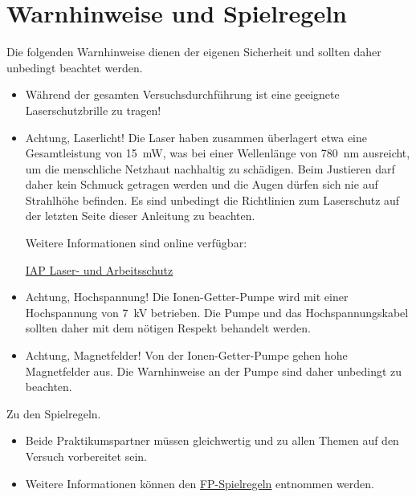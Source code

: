 \documentclass[
class=book,
accentcolor=1b,
custommargins=geometry,
fontsize=11pt,
thesis={type=Versuchsanleitung},
ruledheaders=all,
headline=false,
instbox=false,
marginpar=false,
title=small,
ignore-missing-data=true,
twoside=false,
logofile=apqdesign/tuda_logo.pdf,
pdfa=false %
]{apqpub}
\begin{document}
	\tableofcontents
	
	\mainmatter
	\setcounter{page}{1}
	
	
	
	
\chapter{Warnhinweise und Spielregeln}
Die folgenden Warnhinweise dienen der eigenen Sicherheit und sollten daher unbedingt beachtet werden.
\begin{itemize}
	\item Während der gesamten Versuchsdurchführung ist eine geeignete Laserschutzbrille zu tragen!
	
	\item Achtung, Laserlicht! Die Laser haben zusammen überlagert etwa eine Gesamtleistung von \qty{15}{\milli\watt}, was bei
	einer Wellenlänge von \qty{780}{\nano\metre} ausreicht, um die menschliche Netzhaut nachhaltig zu schädigen. Beim Justieren
	darf daher kein Schmuck getragen werden und die Augen dürfen sich nie auf Strahlhöhe befinden.
	Es sind unbedingt die Richtlinien zum Laserschutz auf der letzten Seite dieser Anleitung zu beachten.
	
	Weitere Informationen sind online verfügbar:
	
	\href{https://www.iap.tu-darmstadt.de/infrastruktur_iap/laser_und_arbeitsschutz_iap/index.de.jsp}{IAP Laser- und Arbeitsschutz}
	
	\item Achtung, Hochspannung! Die Ionen-Getter-Pumpe wird mit einer Hochspannung von \qty{7}{\kilo\volt} betrieben. Die
	Pumpe und das Hochspannungskabel sollten daher mit dem nötigen Respekt behandelt werden.
	
	\item Achtung, Magnetfelder! Von der Ionen-Getter-Pumpe gehen hohe Magnetfelder aus. Die Warnhinweise an
	der Pumpe sind daher unbedingt zu beachten.
\end{itemize}

Zu den Spielregeln.
\begin{itemize}
	\item Beide Praktikumspartner müssen gleichwertig und zu allen Themen auf den Versuch vorbereitet sein.
	
	\item Weitere Informationen können den \href{https://www.physik.tu-darmstadt.de/media/ipkm/studium_ipkm/f_praktikum/fprakt/fpspielregeln.pdf}{FP-Spielregeln} entnommen werden.
\end{itemize}
\end{document}

